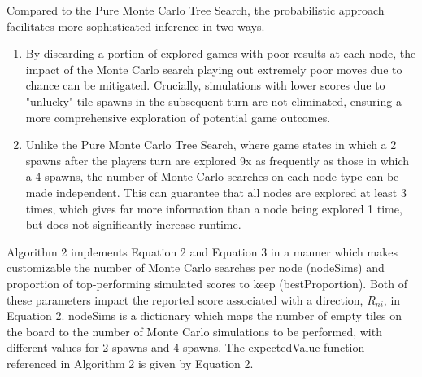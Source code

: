 \documentclass{article}
\begin{document}
Compared to the Pure Monte Carlo Tree Search, the probabilistic approach facilitates more sophisticated inference in two ways. 

\begin{enumerate}
  \item By discarding a portion of explored games with poor results at each node, the impact of the Monte Carlo search playing out extremely poor moves due to chance can be mitigated.  Crucially, simulations with lower scores due to "unlucky" tile spawns in the subsequent turn are not eliminated, ensuring a more comprehensive exploration of potential game outcomes.
  \item Unlike the Pure Monte Carlo Tree Search, where game states in which a 2 spawns after the players turn are explored 9x as frequently as those in which a 4 spawns, the number of Monte Carlo searches on each node type can be made independent.  This can guarantee that all nodes are explored at least 3 times, which gives far more information than a node being explored 1 time, but does not significantly increase runtime.  
 
\end{enumerate}

Algorithm 2 implements Equation 2 and Equation 3 in a manner which makes customizable the number of Monte Carlo searches per node (nodeSims) and proportion of top-performing simulated scores to keep (bestProportion).  Both of these parameters impact the reported score associated with a direction, $R_{ni}$, in Equation 2.  nodeSims is a dictionary which maps the number of empty tiles on the board to the number of Monte Carlo simulations to be performed, with different values for 2 spawns and 4 spawns.  The expectedValue function referenced in Algorithm 2 is given by Equation 2.
\end{document}
